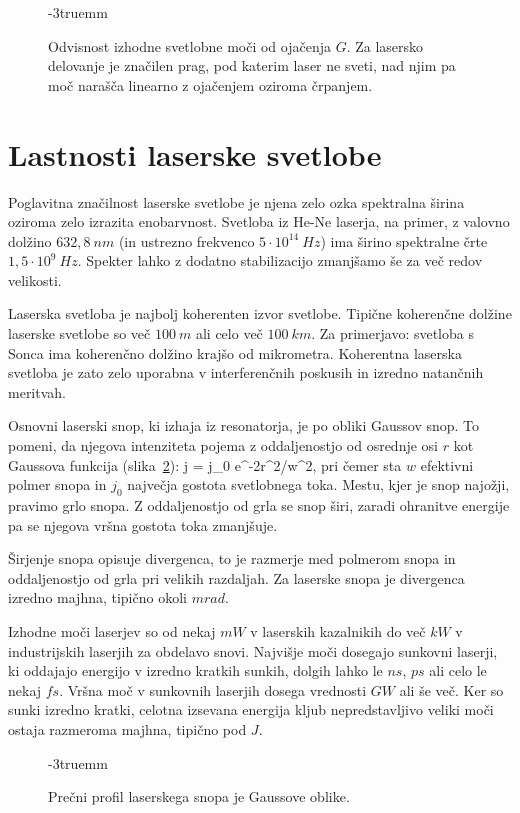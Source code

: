 \begin{figure}[h!]
\centering
\def\svgwidth{60truemm} 

\caption{Odvisnost izhodne svetlobne moči od ojačenja $G$. Za lasersko
delovanje je značilen prag, pod katerim laser ne sveti, nad njim pa moč
narašča linearno z ojačenjem oziroma črpanjem.
}
\label{fig:11_laserG}
\vglue-3truemm
\end{figure}

\section{Lastnosti laserske svetlobe}
Poglavitna značilnost laserske svetlobe je njena zelo ozka spektralna
širina oziroma zelo izrazita enobarvnost. Svetloba iz He-Ne laserja, 
na primer, z valovno dolžino $632,8~\si{nm}$ (in ustrezno frekvenco $
5 \cdot 10^{14}~\si{Hz}$) ima širino spektralne črte 
$1,5 \cdot 10^{9}~\si{Hz}$. Spekter lahko z dodatno stabilizacijo 
zmanjšamo še za več redov velikosti. 

Laserska svetloba je najbolj koherenten izvor svetlobe. Tipične 
koherenčne dolžine laserske svetlobe so več $100~\si{m}$ ali celo 
več $100~\si{km}$. Za primerjavo: svetloba s Sonca ima koherenčno dolžino
krajšo od mikrometra. Koherentna laserska svetloba je zato zelo uporabna
v interferenčnih poskusih in izredno natančnih meritvah.

Osnovni laserski snop, ki izhaja iz resonatorja, je po obliki
Gaussov snop. To pomeni, da njegova intenziteta pojema z oddaljenostjo
od osrednje osi $r$ kot Gaussova funkcija (slika~\ref{fig:11_Gauss}):
\beq
j = j_0 e^{-2r^2/w^2},
\eeq
pri čemer sta $w$ efektivni polmer snopa in $j_0$ največja gostota
svetlobnega toka. Mestu, kjer je snop najožji, pravimo grlo snopa.
Z oddaljenostjo od grla se snop širi, zaradi ohranitve energije pa 
se njegova vršna gostota toka zmanjšuje.

Širjenje snopa opisuje divergenca, to je razmerje med 
polmerom  snopa in oddaljenostjo od grla pri velikih razdaljah. 
Za laserske snopa je divergenca izredno majhna, tipično okoli $\si{mrad}$.

Izhodne moči laserjev so od nekaj $\si{mW}$ v laserskih kazalnikih do 
več $\si{kW}$ v industrijskih laserjih za obdelavo snovi. Najvišje moči 
dosegajo sunkovni laserji, ki oddajajo energijo
v izredno kratkih sunkih, dolgih lahko le $\si{ns}$, $\si{ps}$ ali celo 
le nekaj $\si{fs}$. Vršna moč v sunkovnih laserjih dosega
vrednosti $\si{GW}$ ali še več. Ker so sunki izredno kratki, celotna izsevana 
energija kljub nepredstavljivo veliki moči ostaja razmeroma majhna, tipično 
pod $\si{J}$.
\begin{figure}[h!]
\centering
\def\svgwidth{70truemm} 

\caption{Prečni profil laserskega snopa je Gaussove oblike.
}
\label{fig:11_Gauss}
\vglue-3truemm
\end{figure}
